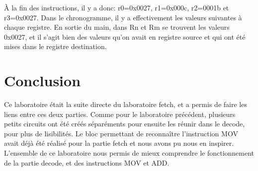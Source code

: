 \documentclass[a4paper]{article} %
\begin{document}
À la fin des instructions, il y a donc: r0=0x0027, r1=0x000c, r2=0001b et r3=0x0027.
Dans le chronogramme, il y a effectivement les valeurs suivantes à chaque registre. En sortie du main, dans Rn et Rm se trouvent les valeurs 0x0027, et il s'agit bien des valeurs qu'on avait en registre source et qui ont été mises dans le registre destination.

\section{Conclusion}
Ce laboratoire était la suite directe du laboratoire fetch, et a permis de faire les liens entre ces deux parties. Comme pour le laboratoire précédent, plusieurs petits circuits ont été créés séparéments pour ensuite les réunir dans le decode, pour plus de lisibilités. Le bloc permettant de reconnaître l'instruction MOV avait déjà été réalisé pour la partie fetch et nous avons pu nous en inspirer. L'ensemble de ce laboratoire nous permis de mieux comprendre le fonctionnement de la partie decode, et des instructions MOV et ADD.
\end{document}
